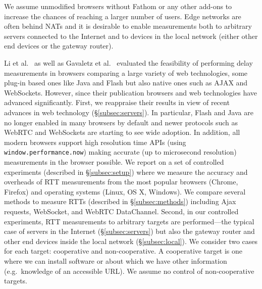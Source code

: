 \documentclass{sig-alternate-10pt}
\begin{document}
We assume unmodified browsers without Fathom or any other add-ons to increase the chances of reaching a larger number of users. Edge networks are often behind NATs and it is desirable to enable measurements both to arbitrary servers connected to the Internet and to devices in the local network (either other end devices or the gateway router). 

Li et al.~\cite{li_appraising_2013} as well as Gavaletz et al.~\cite{gavaletz_-browser_2009} evaluated the feasibility of performing delay measurements in browsers comparing a large variety of web technologies, some plug-in based ones like Java and Flash but also native ones such as AJAX and WebSockets. However, since their publication browsers and web technologies have advanced significantly. First, we reappraise their results in view of recent advances in web technology (\S\ref{subsec:servers}). In particular, Flash and Java are no longer enabled in many browsers by default and newer protocols such as WebRTC and WebSockets are starting to see wide adoption. In addition, all modern browsers support high resolution time APIs (using \texttt{window.performance.now}) making accurate (up to microsecond resolution) measurements in the browser possible. We report on a set of controlled experiments (described in \S\ref{subsec:setup}) where we measure the accuracy and overheads of RTT measurements from the most popular browsers (Chrome, Firefox) and operating systems (Linux, OS X, Windows). We compare several methods to measure RTTs (described in \S\ref{subsec:methods}) including Ajax requests, WebSocket, and WebRTC DataChannel. 
Second, in our controlled experiments, RTT measurements to arbitrary targets are performed---the typical case of servers in the Internet (\S\ref{subsec:servers}) but also the gateway router and other end devices inside the local network (\S\ref{subsec:local}). We consider two cases for each target: cooperative and non-cooperative. A cooperative target is one where we can install software or about which we have other information (e.g.~knowledge of an accessible URL). We assume no control of non-cooperative targets.%
\end{document}
